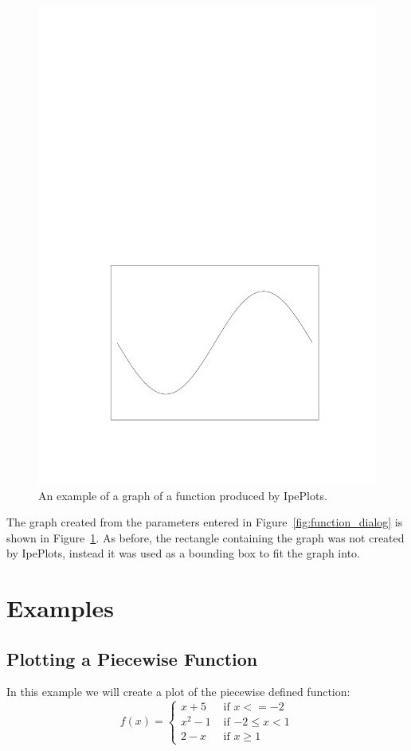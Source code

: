 \documentclass{article}
\begin{document}
\begin{figure}[h]
   \begin{center}
      \includegraphics[scale=.5]{function}
   \end{center}
   \caption{An example of a graph of a function produced by IpePlots.}
   \label{fig:function}
\end{figure}

The graph created from the parameters entered in
Figure~\ref{fig:function_dialog} is shown in Figure~\ref{fig:function}. As
before, the rectangle containing the graph was not created by IpePlots,
instead it was used as a bounding box to fit the graph into. 

\clearpage
\section{Examples}\label{sec:examples}
\subsection{Plotting a Piecewise Function}
In this example we will create a plot of the piecewise defined function:
\[
f(x) = 
\begin{cases}
   x + 5 & \text{ if $x <= -2$}\\
   x^2 - 1 & \text{ if $-2 \le x < 1$}\\
   2 - x & \text{ if $x \ge 1$}
\end{cases}
\]
\end{document}
